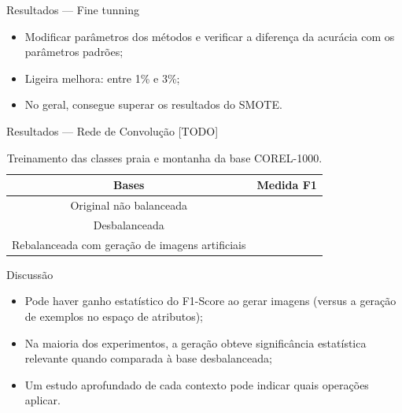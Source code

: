 \documentclass{beamer}
\begin{document}
\begin{frame}{Resultados --- Fine tunning}
  \setlength\leftmargini{1em}
  \begin{itemize}
    \item Modificar parâmetros dos métodos e verificar a diferença da acurácia com os parâmetros padrões;
    \item Ligeira melhora: entre 1\% e 3\%;
    \item No geral, consegue superar os resultados do SMOTE.
  \end{itemize}
\end{frame}
\begin{frame}{Resultados --- Rede de Convolução}
  \setlength\leftmargini{1em}
  [TODO]
  \begin{table}
    \caption{Treinamento das classes praia e montanha da base COREL-1000.}
    \begin{tabular}{c|c}
      Bases    &   Medida F1 \\ \hline
      Original não balanceada     &     \\
      Desbalanceada &     \\
      Rebalanceada com geração de imagens artificiais &     \\
    \end{tabular}
  \end{table}
\end{frame}
\begin{frame}{Discussão}
  \setlength\leftmargini{1em}
  \begin{itemize}
    \item Pode haver ganho estatístico do F1-Score ao gerar imagens (versus a geração de exemplos no espaço de atributos);
    \item Na maioria dos experimentos, a geração obteve significância estatística relevante quando comparada à base desbalanceada;
    \item Um estudo aprofundado de cada contexto pode indicar quais operações aplicar.
  \end{itemize}
\end{frame}
\end{document}
